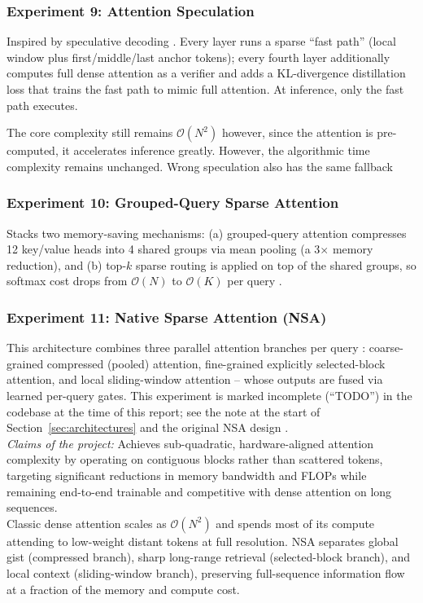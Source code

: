 \documentclass[11pt]{article}
\newcommand{\bigO}{\mathcal{O}}
\begin{document}
\subsubsection*{Experiment 9: Attention Speculation}
\label{exp:speculation}
Inspired by speculative decoding \citep{leviathan2023speculative}. Every layer runs a sparse ``fast path''
(local window plus first/middle/last anchor tokens); every fourth layer
additionally computes full dense attention as a verifier and adds a
KL-divergence distillation loss that trains the fast path to mimic full
attention. At inference, only the fast path executes.

The core complexity still remains  $\bigO(N^2)$ however, since the attention is pre-computed, it accelerates inference greatly. However, the algorithmic time complexity remains unchanged. Wrong speculation also has the same fallback 

\subsubsection*{Experiment 10: Grouped-Query Sparse Attention}
\label{exp:gqa}
Stacks two memory-saving mechanisms: (a) grouped-query attention compresses
12 key/value heads into 4 shared groups via mean pooling (a 3$\times$ memory
reduction), and (b) top-$k$ sparse routing is applied on top of the shared
groups, so softmax cost drops from $\bigO(N)$ to $\bigO(K)$ per query
\citep{ainslie2023gqa}.

\subsubsection*{Experiment 11: Native Sparse Attention (NSA)}
\label{exp:nsa}
This architecture combines three parallel attention branches per
query : coarse-grained compressed (pooled) attention, fine-grained
explicitly selected-block attention, and local sliding-window attention --
whose outputs are fused via learned per-query gates. This experiment is
marked incomplete (``TODO'') in the codebase at the time of this report; see
the note at the start of Section~\ref{sec:architectures} and the original NSA
design \citep{yuan2025nsa}. \\ 
\emph{Claims of the project:} Achieves sub-quadratic, hardware-aligned
attention complexity by operating on contiguous blocks rather than scattered
tokens, targeting significant reductions in memory bandwidth and FLOPs while
remaining end-to-end trainable and competitive with dense attention on long
sequences.\\ 
Classic dense attention
scales as $\bigO(N^2)$ and spends most of its compute attending to low-weight
distant tokens at full resolution. NSA separates global gist (compressed
branch), sharp long-range retrieval (selected-block branch), and local
context (sliding-window branch), preserving full-sequence information flow
at a fraction of the memory and compute cost.
\end{document}

